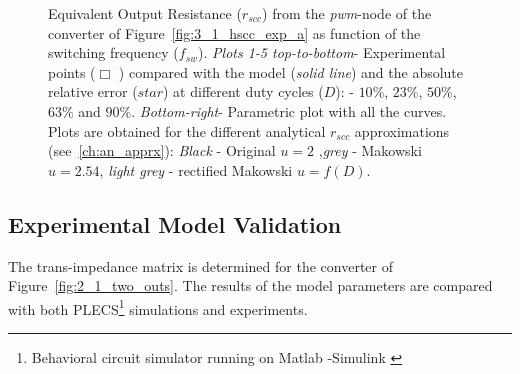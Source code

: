 \begin{figure}[!h]
\centering
    \begin{subfigure}{0.45\textwidth}
        
    \end{subfigure}
    \hfill
    \begin{subfigure}{0.45\textwidth}
        
    \end{subfigure}

    \begin{subfigure}{0.45\textwidth}
        
    \end{subfigure}
    \hfill
    \begin{subfigure}{0.45\textwidth}
        
    \end{subfigure}

        \begin{subfigure}{0.45\textwidth}
        
    \end{subfigure}
    \hfill
    \begin{subfigure}{0.45\textwidth}
        
    \end{subfigure}

\caption{Equivalent Output Resistance ($r_{scc}$) from the \emph{pwm}-node of the converter of Figure~\ref{fig:3_1_hscc_exp_a} as function of the switching frequency ($f_{sw}$). \emph{Plots 1-5 top-to-bottom}-  Experimental points ($\Box$ ) compared with the model (\emph{solid line}) and the absolute relative error ($star$)  at different duty cycles ($D$): - $10\%$, $23\%$, $50\%$, $63\%$ and $90\%$. \emph{Bottom-right}- Parametric plot with all the curves. Plots are obtained for the different analytical $r_{scc}$ approximations (see~\ref{ch:an_apprx}): \emph{Black} - Original $u=2$ ,\emph{grey} - Makowski  $u=2.54$, \emph{light grey} - rectified Makowski $u=f(D)$. }\label{fig:exp_rscc_pwm_node_fsw}
\end{figure}




\subsection{Experimental Model Validation}

The trans-impedance matrix is determined for the converter of Figure~\ref{fig:2_1_two_outs}. The results of the model parameters are compared with both  PLECS\footnote[1]{Behavioral circuit simulator running on Matlab \textsuperscript{\textregistered}-Simulink \textsuperscript{\textregistered}} simulations and experiments.

